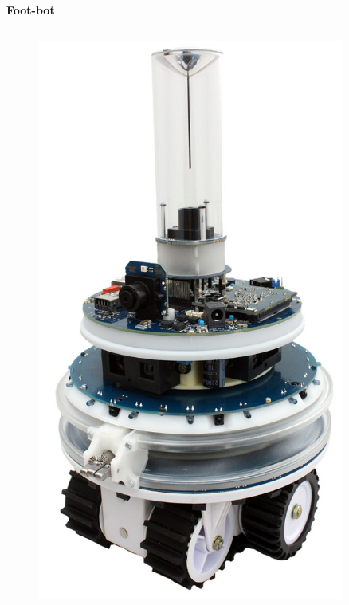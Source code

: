 \documentclass[xcolor=dvipsnames]{beamer}
\begin{document}
\begin{frame}{\bf Foot-bot}
\begin{columns}
	\begin{column}{0.48\textwidth}

	\begin{figure}[ht]
	\begin{center}
	\begin{minipage}{0.9\linewidth}
	\begin{center}
	\includegraphics[width=0.9\textwidth]{images/foot_bot.jpg}
	\end{center}
	\end{minipage}
	\end{center}
	\end{figure}


\end{column}
\end{columns}
\end{frame}
\end{document}
